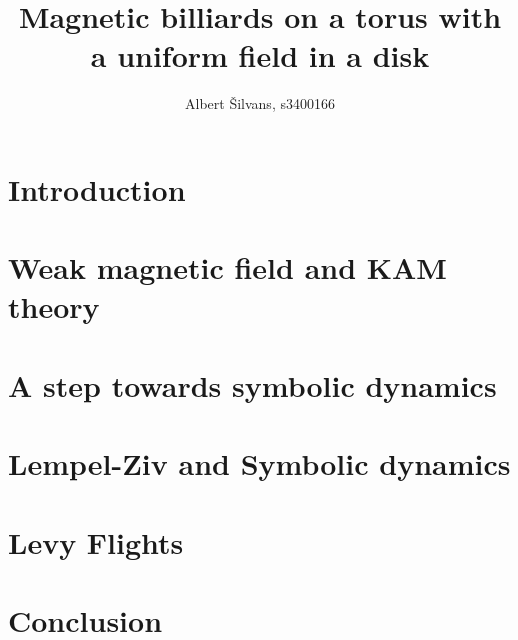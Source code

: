 \documentclass[notitlepage, a4paper]{article}
\title{Magnetic billiards on a torus with a uniform field in a disk}
\author{Albert \v{S}ilvans, s3400166}
\theoremstyle{definition}
\begin{document}
\maketitle
\newpage
\tableofcontents
\listoffigures
\listoftables
\newpage

\section{Introduction}







\section{Weak magnetic field and KAM theory}






\section{A step towards symbolic dynamics}



\section{Lempel-Ziv and Symbolic dynamics}



\section{Levy Flights}


\section{Conclusion}



\newpage


\end{document}
